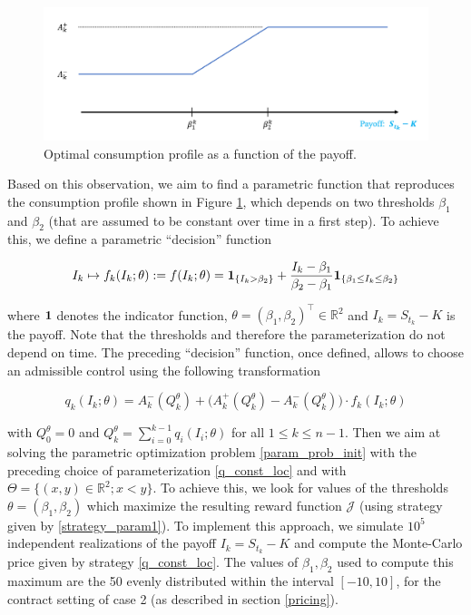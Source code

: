 \documentclass{article}
\newcommand{\q}[1]{``#1''}
\renewcommand{\q}[1]{``#1''}
\numberwithin{equation}{section}
\begin{document}
\begin{figure}[!ht]
    \center
    \includegraphics[scale=0.4]{Images/decision_profile.PNG}
    \caption{Optimal consumption profile as a function of the payoff.}
    \label{decision_profile}
\end{figure}


Based on this observation, we aim to find a parametric function that reproduces the consumption profile shown in Figure \ref{decision_profile}, which depends on two thresholds $\beta_1$ and $\beta_2$ (that are assumed to be constant over time in a first step). To achieve this, we define a parametric \q{decision} function

\begin{equation}
        I_k \mapsto f_{k}(I_k; \theta) := f(I_k; \theta) = \mbox{\bf 1}_{\{I_k > \beta_2\}} + \frac{I_k - \beta_1}{\beta_2 - \beta_1}\mbox{\bf 1}_{\{\beta_1 \le I_k \le \beta_2\}}
        \label{strategy_param1}
\end{equation}

\noindent
where $\mbox{\bf 1}$ denotes the indicator function, $\theta = (\beta_1, \beta_2)^\top \in \mathbb{R}^2$ and $I_k = S_{t_k} - K$ is the payoff. Note that the thresholds and therefore the parameterization do not depend on time. The preceding \q{decision} function, once defined, allows to choose an admissible control using the following transformation

\begin{equation}
\label{q_const_loc}
q_k(I_k; \theta) = A_k^{-}(Q_k^\theta) + \Big(A_k^{+}(Q_k^\theta) - A_k^{-}(Q_k^\theta) \Big) \cdot f_{k}(I_k; \theta)
\end{equation}

\noindent
with $Q_0^\theta = 0$ and $Q_k^\theta = \displaystyle \sum_{i = 0}^{k-1} q_i(I_i; \theta)$ for all $1 \le k \le n-1$. Then we aim at solving the parametric optimization problem \eqref{param_prob_init} with the preceding choice of parameterization \eqref{q_const_loc} and with $\Theta = \{(x, y) \in \mathbb{R}^2 ; x < y\}$. To achieve this, we look for values of the thresholds $ \theta  = (\beta_1, \beta_2)$ which maximize the resulting reward function $\mathcal{J}$ (using strategy given by \eqref{strategy_param1}). To implement this approach, we simulate $10^5$ independent realizations of the payoff $I_k = S_{t_k} - K$ and compute the Monte-Carlo price given by strategy \eqref{q_const_loc}. The values of $\beta_1, \beta_2$ used to compute this maximum are the 50 evenly distributed within the interval $[-10, 10]$, for the contract setting of case 2 (as described in section \ref{pricing}).
\end{document}

